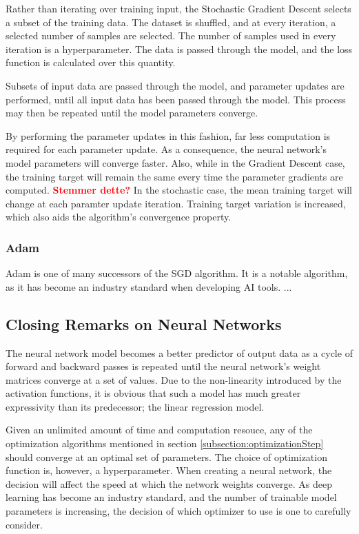 Rather than iterating over training input, the Stochastic Gradient Descent selects a subset of the training data.
The dataset is shuffled, and at every iteration, a selected number of samples are selected. 
The number of samples used in every iteration is a hyperparameter.
The data is passed through the model, and the loss function is calculated over this quantity.

Subsets of input data are passed through the model, and parameter updates are performed, until all input data has been passed through the model.
This process may then be repeated until the model parameters converge.

By performing the parameter updates in this fashion, far less computation is required for each parameter update.
As a consequence, the neural network's model parameters will converge faster. 
Also, while in the Gradient Descent case, the training target will remain the same every time the parameter gradients are computed.
\textcolor{red}{\textbf{Stemmer dette?}} In the stochastic case, the mean training target will change at each paramter update iteration. 
Training target variation is increased, which also aids the algorithm's convergence property.


\subsubsection{Adam}

Adam is one of many successors of the SGD algorithm. 
It is a notable algorithm, as it has become an industry standard when developing AI tools.
...









\subsection{Closing Remarks on Neural Networks}

The neural network model becomes a better predictor of output data as a cycle of forward and backward passes
is repeated until the neural network's weight matrices converge at a set of values.
Due to the non-linearity introduced by the activation functions, it is obvious that
such a model has much greater expressivity than its predecessor; the linear regression model.

Given an unlimited amount of time and computation resouce, any of the optimization 
algorithms mentioned in section \ref{subsection:optimizationStep} should converge 
at an optimal set of parameters.
The choice of optimization function is, however, a hyperparameter. 
When creating a neural network, the decision will affect the speed at which the 
network weights converge.
As deep learning has become an industry standard, and the number of trainable model parameters
is increasing, the decision of which optimizer to use is one to carefully consider.







